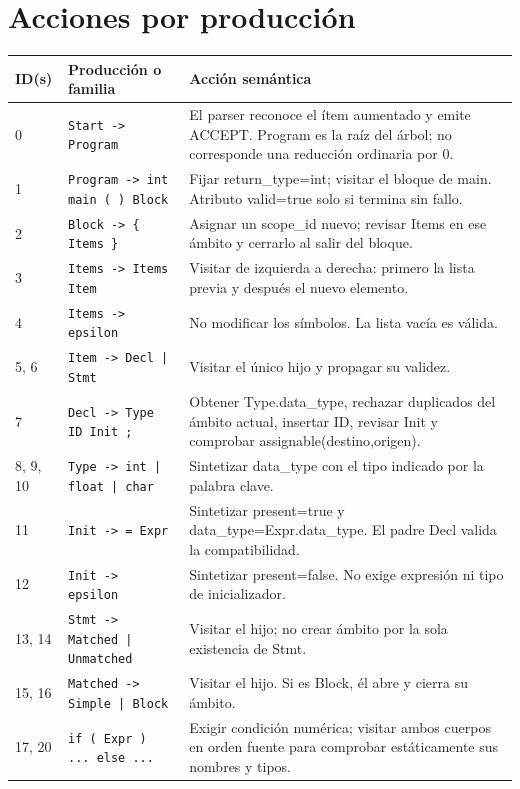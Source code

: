 \section*{Acciones por producción}
{\small\renewcommand{\arraystretch}{1.0}\begin{longtable}{p{1.4cm}p{4.5cm}p{9.6cm}}\toprule ID(s) & Producción o familia & Acción semántica\\\midrule\endhead
0 & \texttt{Start -\textgreater{} Program} & El parser reconoce el ítem aumentado y emite ACCEPT. Program es la raíz del árbol; no corresponde una reducción ordinaria por 0.\\
1 & \texttt{Program -\textgreater{} int main ( ) Block} & Fijar return\_type=int; visitar el bloque de main. Atributo valid=true solo si termina sin fallo.\\
2 & \texttt{Block -\textgreater{} \{ Items \}} & Asignar un scope\_id nuevo; revisar Items en ese ámbito y cerrarlo al salir del bloque.\\
3 & \texttt{Items -\textgreater{} Items Item} & Visitar de izquierda a derecha: primero la lista previa y después el nuevo elemento.\\
4 & \texttt{Items -\textgreater{} epsilon} & No modificar los símbolos. La lista vacía es válida.\\
5, 6 & \texttt{Item -\textgreater{} Decl | Stmt} & Visitar el único hijo y propagar su validez.\\
7 & \texttt{Decl -\textgreater{} Type ID Init ;} & Obtener Type.data\_type, rechazar duplicados del ámbito actual, insertar ID, revisar Init y comprobar assignable(destino,origen).\\
8, 9, 10 & \texttt{Type -\textgreater{} int | float | char} & Sintetizar data\_type con el tipo indicado por la palabra clave.\\
11 & \texttt{Init -\textgreater{} = Expr} & Sintetizar present=true y data\_type=Expr.data\_type. El padre Decl valida la compatibilidad.\\
12 & \texttt{Init -\textgreater{} epsilon} & Sintetizar present=false. No exige expresión ni tipo de inicializador.\\
13, 14 & \texttt{Stmt -\textgreater{} Matched | Unmatched} & Visitar el hijo; no crear ámbito por la sola existencia de Stmt.\\
15, 16 & \texttt{Matched -\textgreater{} Simple | Block} & Visitar el hijo. Si es Block, él abre y cierra su ámbito.\\
17, 20 & \texttt{if ( Expr ) ... else ...} & Exigir condición numérica; visitar ambos cuerpos en orden fuente para comprobar estáticamente sus nombres y tipos.\\

\end{longtable}}

